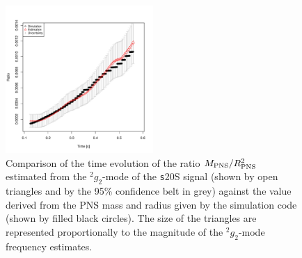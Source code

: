 \begin{figure}
 \centering
 \includegraphics[width=0.5\textwidth]{plots/ratio}
 \caption{Comparison of the time evolution of the ratio $M_{\rm PNS}/R_{\rm PNS}^2$ estimated from the $\mbox{}^2 g_2$-mode of the {\texttt s20S} signal (shown by open triangles and by the 95\% confidence belt in grey) against the value derived from the PNS mass and radius given by the simulation code (shown by filled black circles). The size of the triangles are represented proportionally to the magnitude of the $\mbox{}^2 g_2$-mode frequency estimates.}
 \label{fig:ratio}
\end{figure}


